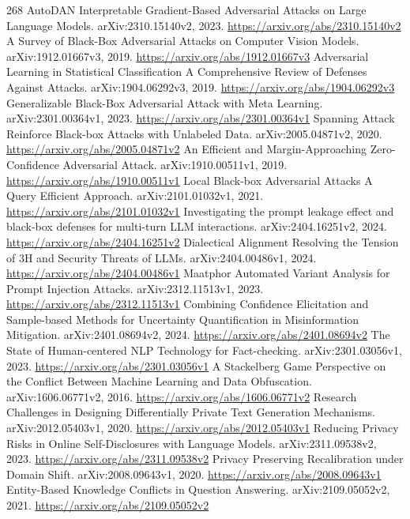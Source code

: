 \documentclass[11pt]{article}
\begin{document}
\begin{thebibliography}{268}
 AutoDAN Interpretable Gradient-Based Adversarial Attacks on Large Language Models. arXiv:2310.15140v2, 2023. \url{https://arxiv.org/abs/2310.15140v2}
 A Survey of Black-Box Adversarial Attacks on Computer Vision Models. arXiv:1912.01667v3, 2019. \url{https://arxiv.org/abs/1912.01667v3}
 Adversarial Learning in Statistical Classification A Comprehensive Review of Defenses Against Attacks. arXiv:1904.06292v3, 2019. \url{https://arxiv.org/abs/1904.06292v3}
 Generalizable Black-Box Adversarial Attack with Meta Learning. arXiv:2301.00364v1, 2023. \url{https://arxiv.org/abs/2301.00364v1}
 Spanning Attack Reinforce Black-box Attacks with Unlabeled Data. arXiv:2005.04871v2, 2020. \url{https://arxiv.org/abs/2005.04871v2}
 An Efficient and Margin-Approaching Zero-Confidence Adversarial Attack. arXiv:1910.00511v1, 2019. \url{https://arxiv.org/abs/1910.00511v1}
 Local Black-box Adversarial Attacks A Query Efficient Approach. arXiv:2101.01032v1, 2021. \url{https://arxiv.org/abs/2101.01032v1}
 Investigating the prompt leakage effect and black-box defenses for multi-turn LLM interactions. arXiv:2404.16251v2, 2024. \url{https://arxiv.org/abs/2404.16251v2}
 Dialectical Alignment Resolving the Tension of 3H and Security Threats of LLMs. arXiv:2404.00486v1, 2024. \url{https://arxiv.org/abs/2404.00486v1}
 Maatphor Automated Variant Analysis for Prompt Injection Attacks. arXiv:2312.11513v1, 2023. \url{https://arxiv.org/abs/2312.11513v1}
 Combining Confidence Elicitation and Sample-based Methods for Uncertainty Quantification in Misinformation Mitigation. arXiv:2401.08694v2, 2024. \url{https://arxiv.org/abs/2401.08694v2}
 The State of Human-centered NLP Technology for Fact-checking. arXiv:2301.03056v1, 2023. \url{https://arxiv.org/abs/2301.03056v1}
 A Stackelberg Game Perspective on the Conflict Between Machine Learning and Data Obfuscation. arXiv:1606.06771v2, 2016. \url{https://arxiv.org/abs/1606.06771v2}
 Research Challenges in Designing Differentially Private Text Generation Mechanisms. arXiv:2012.05403v1, 2020. \url{https://arxiv.org/abs/2012.05403v1}
 Reducing Privacy Risks in Online Self-Disclosures with Language Models. arXiv:2311.09538v2, 2023. \url{https://arxiv.org/abs/2311.09538v2}
 Privacy Preserving Recalibration under Domain Shift. arXiv:2008.09643v1, 2020. \url{https://arxiv.org/abs/2008.09643v1}
 Entity-Based Knowledge Conflicts in Question Answering. arXiv:2109.05052v2, 2021. \url{https://arxiv.org/abs/2109.05052v2}

\end{thebibliography}
\end{document}
